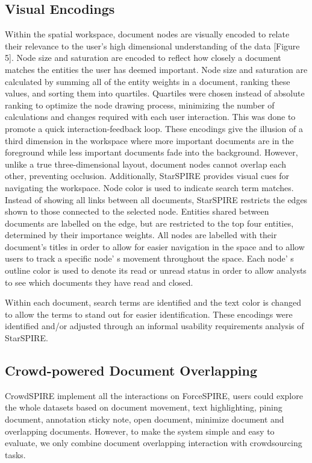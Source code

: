 \documentclass[journal]{vgtc}                %
\begin{document}
\subsection{Visual Encodings}
Within the spatial workspace, document nodes are visually encoded to relate their relevance to the user’s high dimensional understanding of the data [Figure 5].
Node size and saturation are encoded to reflect how closely a document matches the entities the user has deemed important.
Node size and saturation are calculated by summing all of the entity weights in a document, ranking these values, and sorting them into quartiles.
Quartiles were chosen instead of absolute
ranking to optimize the node drawing process, minimizing the number of calculations and changes required with each user interaction.
This was done to promote a quick interaction-feedback loop.
These encodings give the illusion of a third dimension in the workspace where more important documents are in the foreground while less important documents fade into the background.
However, unlike a true three-dimensional layout, document nodes cannot overlap each other, preventing occlusion.
Additionally, StarSPIRE provides visual cues for navigating the workspace.
Node color is used to indicate search term matches.
Instead of showing all links between all documents, StarSPIRE restricts the edges shown to those connected to the selected node.
Entities shared between documents are labelled on the edge, but are restricted to the top four entities, determined by their importance weights.
All nodes are labelled with their document’s titles in order to allow for easier navigation in the space and to allow users to track a specific node’ s movement throughout the space.
Each node’ s outline color is used to denote its read or unread status in order to allow analysts to see which documents they have read and closed.

Within each document, search terms are identified and the text color is changed to allow the terms to stand out for easier identification.
These encodings were identified and/or adjusted through an informal usability requirements analysis of StarSPIRE.

\subsection{Crowd-powered Document Overlapping}
CrowdSPIRE implement all the interactions on ForceSPIRE, users could explore the whole datasets based on document movement, text highlighting, pining document, annotation sticky note, open document, minimize document and overlapping documents. However, to make the system simple and easy to evaluate, we only combine document overlapping interaction with crowdsourcing tasks.
\end{document}
